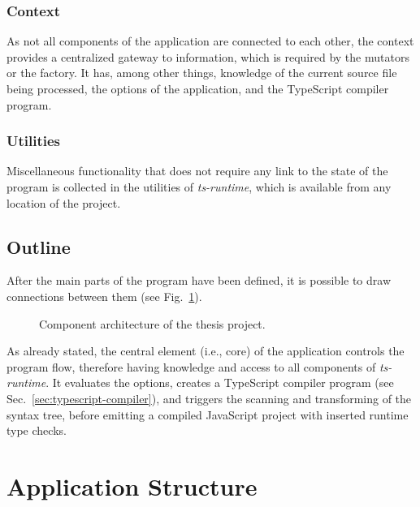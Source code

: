 \subsubsection{Context}

As not all components of the application are connected to each other, the context provides a centralized gateway to information, which is required by the mutators or the factory. It has, among other things, knowledge of the current source file being processed, the options of the application, and the TypeScript compiler program.

\subsubsection{Utilities}

Miscellaneous functionality that does not require any link to the state of the program is collected in the utilities of \emph{ts-runtime}, which is available from any location of the project.

\subsection{Outline}

After the main parts of the program have been defined, it is possible to draw connections between them (see Fig.~\ref{fig:architecture}).
\begin{figure}
\centering

\caption{Component architecture of the thesis project.}
\label{fig:architecture}
\end{figure}
As already stated, the central element (i.e., core) of the application controls the program flow, therefore having knowledge and access to all components of \emph{ts-runtime}. It evaluates the options, creates a TypeScript compiler program (see Sec.~\ref{sec:typescript-compiler}), and triggers the scanning and transforming of the syntax tree, before emitting a compiled JavaScript project with inserted runtime type checks. 

\pagebreak
\section{Application Structure}
\label{sec:structure}

